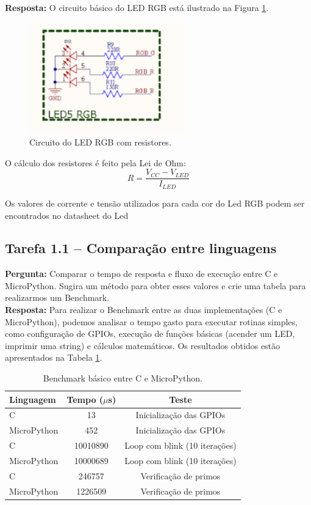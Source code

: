 \documentclass{article}
\begin{document}
\textbf{Resposta:} O circuito básico do LED RGB está ilustrado na Figura \ref{fig:circuito_led}.  

\begin{figure}[H]
    \centering
    \includegraphics[width=0.6\textwidth]{circuito_led.png}
    \caption{Circuito do LED RGB com resistores.}
    \label{fig:circuito_led}
\end{figure}

O cálculo dos resistores é feito pela Lei de Ohm:  
\[
R = \frac{V_{CC} - V_{LED}}{I_{LED}}
\]

Os valores de corrente e tensão utilizados para cada cor do Led RGB podem ser encontrados no datasheet do Led

\subsection{Tarefa 1.1 -- Comparação entre linguagens}
\textbf{Pergunta:} Comparar o tempo de resposta e fluxo de execução entre C e MicroPython. Sugira um método para obter esses valores e crie uma tabela para realizarmos um Benchmark. \\

\textbf{Resposta:}  
Para realizar o Benchmark entre as duas implementações (C e MicroPython), podemos analisar o tempo gasto para executar rotinas simples, como configuração de GPIOs, execução de funções básicas (acender um LED, imprimir uma string) e cálculos matemáticos. Os resultados obtidos estão apresentados na Tabela \ref{tab:benchmark}.  

\begin{table}[H]
    \centering
    \label{tab:benchmark}
    \begin{tabular}{lcc}
        \toprule
        Linguagem & Tempo ($\mu$s) & Teste \\
        \midrule
        C            & 13       & Inicialização das GPIOs \\
        MicroPython  & 452      & Inicialização das GPIOs \\
        C            & 10010890 & Loop com blink (10 iterações) \\
        MicroPython  & 10000689 & Loop com blink (10 iterações) \\
        C            & 246757   & Verificação de primos \\
        MicroPython  & 1226509  & Verificação de primos \\
        \bottomrule
    \end{tabular}
    \caption{Benchmark básico entre C e MicroPython.}
\end{table}
\end{document}
